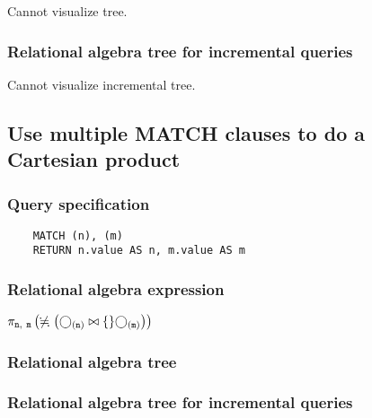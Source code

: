 	Cannot visualize tree.

	\subsubsection*{Relational algebra tree for incremental queries}

	Cannot visualize incremental tree.
	\subsection{Use multiple MATCH clauses to do a Cartesian product}

	\subsubsection*{Query specification}

	\begin{lstlisting}
	MATCH (n), (m)
	RETURN n.value AS n, m.value AS m
	\end{lstlisting}


	\subsubsection*{Relational algebra expression}

	$\projection{\var{n},~\var{m}} \left(\alldifferent{} \left(\getvertices{n}{} \join \{\} \getvertices{m}{}\right)\right)$

	\subsubsection*{Relational algebra tree}


	\subsubsection*{Relational algebra tree for incremental queries}

